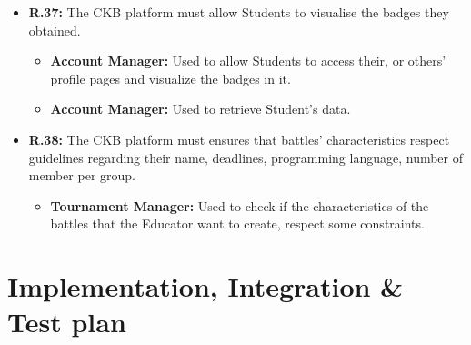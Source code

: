 \documentclass{article}
\begin{document}
{\begin{itemize}
\begin{itemize}
\begin{itemize}
            \item \textbf{Tournament Manager:} Used to retrieve tournament's data and specifically Student's results in it.
          \end{itemize}
    \item \textbf{R.37:} The CKB platform must allow Students to visualise the badges they obtained.
          \begin{itemize}
              \item \textbf{Account Manager:} Used to allow Students to access their, or others'
              profile pages and visualize the badges in it.
              \item \textbf{Account Manager:} Used to retrieve Student's data.
          \end{itemize}
    \item \textbf{R.38:} The CKB platform must ensures that battles' characteristics respect guidelines
          regarding their name, deadlines, programming language, number of member per group.
          \begin{itemize}
            \item \textbf{Tournament Manager:} Used to check if the characteristics of the battles
              that the Educator want to create, respect some constraints.
          \end{itemize}
\end{itemize}
\section{Implementation, Integration \& Test plan}

\newpage

\end{itemize}}
\end{document}
